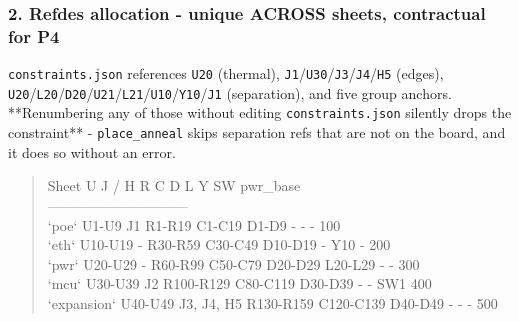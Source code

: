 \documentclass[11pt,a4paper]{article}
\begin{document}
\subsubsection*{2. Refdes allocation - unique ACROSS sheets, contractual for P4}
\texttt{constraints.json} references \texttt{U20} (thermal), \texttt{J1}/\texttt{U30}/\texttt{J3}/\texttt{J4}/\texttt{H5} (edges), \texttt{U20}/\texttt{L20}/\texttt{D20}/\texttt{U21}/\texttt{L21}/\texttt{U10}/\texttt{Y10}/\texttt{J1} (separation), and five group anchors. {*}{*}Renumbering any of those without editing \texttt{constraints.json} silently drops the constraint{*}{*} - \texttt{place\_anneal} skips separation refs that are not on the board, and it does so without an error.

\begin{quote}\small\ttfamily\raggedright
\textbar{} Sheet \textbar{} U \textbar{} J / H \textbar{} R \textbar{} C \textbar{} D \textbar{} L \textbar{} Y \textbar{} SW \textbar{} pwr\_base \textbar{}\\
\textbar{}---\textbar{}---\textbar{}---\textbar{}---\textbar{}---\textbar{}---\textbar{}---\textbar{}---\textbar{}---\textbar{}---\textbar{}\\
\textbar{} `poe` \textbar{} U1-U9 \textbar{} J1 \textbar{} R1-R19 \textbar{} C1-C19 \textbar{} D1-D9 \textbar{} - \textbar{} - \textbar{} - \textbar{} 100 \textbar{}\\
\textbar{} `eth` \textbar{} U10-U19 \textbar{} - \textbar{} R30-R59 \textbar{} C30-C49 \textbar{} D10-D19 \textbar{} - \textbar{} Y10 \textbar{} - \textbar{} 200 \textbar{}\\
\textbar{} `pwr` \textbar{} U20-U29 \textbar{} - \textbar{} R60-R99 \textbar{} C50-C79 \textbar{} D20-D29 \textbar{} L20-L29 \textbar{} - \textbar{} - \textbar{} 300 \textbar{}\\
\textbar{} `mcu` \textbar{} U30-U39 \textbar{} J2 \textbar{} R100-R129 \textbar{} C80-C119 \textbar{} D30-D39 \textbar{} - \textbar{} - \textbar{} SW1 \textbar{} 400 \textbar{}\\
\textbar{} `expansion` \textbar{} U40-U49 \textbar{} J3, J4, H5 \textbar{} R130-R159 \textbar{} C120-C139 \textbar{} D40-D49 \textbar{} - \textbar{} - \textbar{} - \textbar{} 500 \textbar{}
\end{quote}
\end{document}
